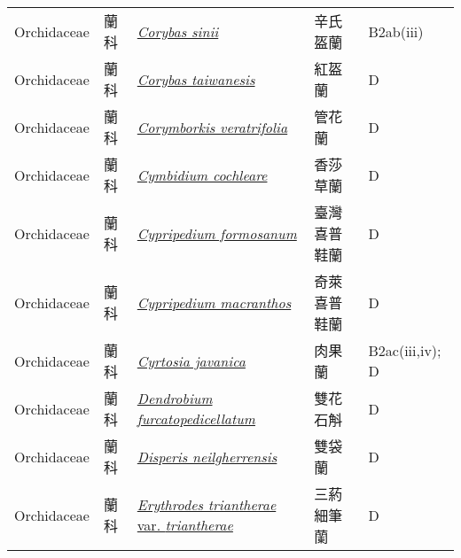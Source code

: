 {\begin{longtable}{p{2.5cm}p{2.5cm}p{4.5cm}p{2.5cm}p{3cm}}
    Orchidaceae & 蘭科 & \href{http://www.theplantlist.org/tpl1.1/search?q=Corybas+sinii}{\textit{Corybas sinii} } & 辛氏盔蘭 & B2ab(iii) \index{Corybas@\textit{Corybas}!sinii@\textit{sinii}}  \index{辛氏盔蘭} \\
    Orchidaceae & 蘭科 & \href{http://www.theplantlist.org/tpl1.1/search?q=Corybas+taiwanesis}{\textit{Corybas taiwanesis} } & 紅盔蘭 & D \index{Corybas@\textit{Corybas}!taiwanesis@\textit{taiwanesis}}  \index{紅盔蘭} \\
    Orchidaceae & 蘭科 & \href{http://www.theplantlist.org/tpl1.1/search?q=Corymborkis+veratrifolia}{\textit{Corymborkis veratrifolia} } & 管花蘭 & D \index{Corymborkis@\textit{Corymborkis}!veratrifolia@\textit{veratrifolia}}  \index{管花蘭} \\
    Orchidaceae & 蘭科 & \href{http://www.theplantlist.org/tpl1.1/search?q=Cymbidium+cochleare}{\textit{Cymbidium cochleare} } & 香莎草蘭 & D \index{Cymbidium@\textit{Cymbidium}!cochleare@\textit{cochleare}}  \index{香莎草蘭} \\
    Orchidaceae & 蘭科 & \href{http://www.theplantlist.org/tpl1.1/search?q=Cypripedium+formosanum}{\textit{Cypripedium formosanum} } & 臺灣喜普鞋蘭 & D \index{Cypripedium@\textit{Cypripedium}!formosanum@\textit{formosanum}}  \index{臺灣喜普鞋蘭} \\
    Orchidaceae & 蘭科 & \href{http://www.theplantlist.org/tpl1.1/search?q=Cypripedium+macranthos}{\textit{Cypripedium macranthos} } & 奇萊喜普鞋蘭 & D \index{Cypripedium@\textit{Cypripedium}!macranthos@\textit{macranthos}}  \index{奇萊喜普鞋蘭} \\
    Orchidaceae & 蘭科 & \href{http://www.theplantlist.org/tpl1.1/search?q=Cyrtosia+javanica}{\textit{Cyrtosia javanica} } & 肉果蘭 & B2ac(iii,iv); D \index{Cyrtosia@\textit{Cyrtosia}!javanica@\textit{javanica}}  \index{肉果蘭} \\
    Orchidaceae & 蘭科 & \href{http://www.theplantlist.org/tpl1.1/search?q=Dendrobium+furcatopedicellatum}{\textit{Dendrobium furcatopedicellatum} } & 雙花石斛 & D \index{Dendrobium@\textit{Dendrobium}!furcatopedicellatum@\textit{furcatopedicellatum}}  \index{雙花石斛} \\
    Orchidaceae & 蘭科 & \href{http://www.theplantlist.org/tpl1.1/search?q=Disperis+neilgherrensis}{\textit{Disperis neilgherrensis} } & 雙袋蘭 & D \index{Disperis@\textit{Disperis}!neilgherrensis@\textit{neilgherrensis}}  \index{雙袋蘭} \\
    Orchidaceae & 蘭科 & \href{http://www.theplantlist.org/tpl1.1/search?q=Erythrodes+triantherae+var.+triantherae}{\textit{Erythrodes triantherae} var. \textit{triantherae} } & 三葯細筆蘭 & D \index{Erythrodes@\textit{Erythrodes}!triantherae@\textit{triantherae}!var. triantherae@var. \textit{triantherae}}  \index{三葯細筆蘭} \\

\end{longtable}}
